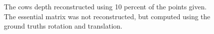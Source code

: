 \documentclass{paper}
\begin{document}
\begin{figure}
\begin{subfigure}{0.3\textwidth}
\end{subfigure}
\caption{The cows depth reconstructed using 10 percent of the points given.
The essential matrix was not reconstructed, but computed using the ground
truths rotation and translation.}
\end{figure}


\end{document}
